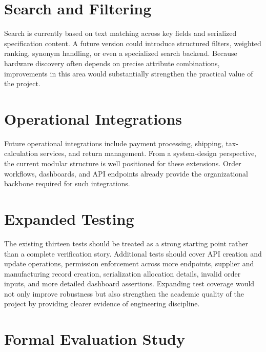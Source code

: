 \documentclass[12pt,letterpaper,oneside,openany]{book}
\begin{document}
\section{Search and Filtering}

\begin{justifying}
Search is currently based on text matching across key fields and serialized
specification content. A future version could introduce structured filters,
weighted ranking, synonym handling, or even a specialized search backend.
Because hardware discovery often depends on precise attribute combinations,
improvements in this area would substantially strengthen the practical value of
the project.
\end{justifying}

\section{Operational Integrations}

\begin{justifying}
Future operational integrations include payment processing, shipping,
tax-calculation services, and return management. From a system-design
perspective, the current modular structure is well positioned for these
extensions. Order workflows, dashboards, and API endpoints already provide the
organizational backbone required for such integrations.
\end{justifying}

\section{Expanded Testing}

\begin{justifying}
The existing thirteen tests should be treated as a strong starting point rather
than a complete verification story. Additional tests should cover API creation
and update operations, permission enforcement across more endpoints, supplier
and manufacturing record creation, serialization allocation details, invalid
order inputs, and more detailed dashboard assertions. Expanding test coverage
would not only improve robustness but also strengthen the academic quality of
the project by providing clearer evidence of engineering discipline.
\end{justifying}

\section{Formal Evaluation Study}
\end{document}

